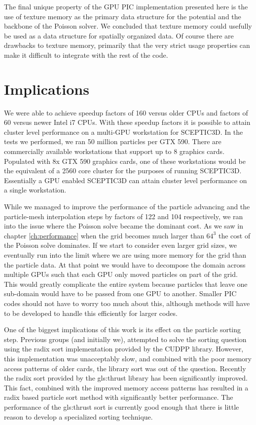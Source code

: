 The final unique property of the GPU PIC implementation presented here is the use of texture memory as the primary data structure for the potential and the backbone of the Poisson solver. We concluded that texture memory could usefully be used as a data structure for spatially organized data. Of course there are drawbacks to texture memory, primarily that the very strict usage properties can make it difficult to integrate with the rest of the code. 



\section{Implications}
We were able to achieve speedup factors of 160 versus older CPUs and factors of 60 versus newer Intel i7 CPUs. With these speedup factors it is possible to attain cluster level performance on a multi-GPU workstation for SCEPTIC3D. In the tests we performed, we ran 50 million particles per GTX 590. There are commercially available workstations that support up to 8 graphics cards. Populated with 8x GTX 590 graphics cards, one of these workstations would be the equivalent of a 2560 core cluster for the purposes of running SCEPTIC3D. Essentially a GPU enabled SCEPTIC3D can attain cluster level performance on a single workstation. 

While we managed to improve the performance of the particle advancing and the particle-mesh interpolation steps by factors of 122 and 104 respectively, we ran into the issue where the Poisson solve became the dominant cost. As we saw in chapter \ref{ch:performance} when the grid becomes much larger than $64^3$ the cost of the Poisson solve dominates. If we start to consider even larger grid sizes, we eventually run into the limit where we are using more memory for the grid than the particle data. At that point we would have to decompose the domain across multiple GPUs such that each GPU only moved particles on part of the grid. This would greatly complicate the entire system because particles that leave one sub-domain would have to be passed from one GPU to another. Smaller PIC codes should not have to worry too much about this, although methods will have to be developed to handle this efficiently for larger codes.

One of the biggest implications of this work is its effect on the particle sorting step. Previous groups (and initially we), attempted to solve the sorting question using the radix sort implementation provided by the CUDPP library. However, this implementation was unacceptably slow, and combined with the poor memory access patterns of older cards, the library sort was out of the question. Recently the radix sort provided by the \gls{gls:thrust} library has been significantly improved. This fact, combined with the improved memory access patterns has resulted in a radix based particle sort method with significantly better performance. The performance of the \gls{gls:thrust} sort is currently good enough that there is little reason to develop a specialized sorting technique. 

